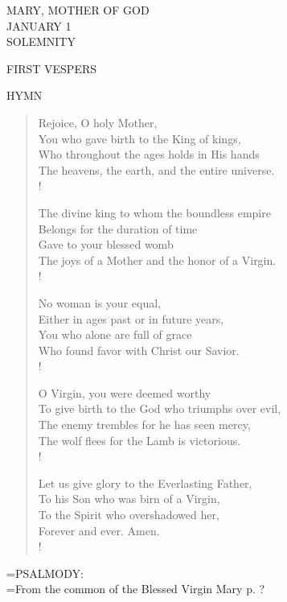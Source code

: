 \begin{center}\normalsize MARY, MOTHER OF GOD\\
\footnotesize JANUARY 1\\
\footnotesize SOLEMNITY\\
\end{center}

\begin{flushleft}\normalsize FIRST VESPERS\\\end{flushleft}

\noindent\small{\uppercase{Hymn}}\normalsize
\begin{verse}
Rejoice, O holy Mother,\\
You who gave birth to the King of kings,\\
Who throughout the ages holds in His hands\\
The heavens, the earth, and the entire universe.\\!

The divine king to whom the boundless empire\\
Belongs for the duration of time\\
Gave to your blessed womb\\
The joys of a Mother and the honor of a Virgin.\\!

No woman is your equal,\\
Either in ages past or in future years,\\
You who alone are full of grace\\
Who found favor with Christ our Savior.\\!

O Virgin, you were deemed worthy\\
To give birth to the God who triumphs over evil,\\
The enemy trembles for he has seen mercy,\\
The wolf flees for the Lamb is victorious.\\!

Let us give glory to the Everlasting Father,\\
To his Son who was birn of a Virgin,\\
To the Spirit who overshadowed her,\\
Forever and ever. Amen.\\!
\end{verse}

\hangindent=\parindent \small{PSALMODY:}\\
\hangindent=\parindent  From the common of the Blessed Virgin Mary p. ?\vspace{0.5em}

